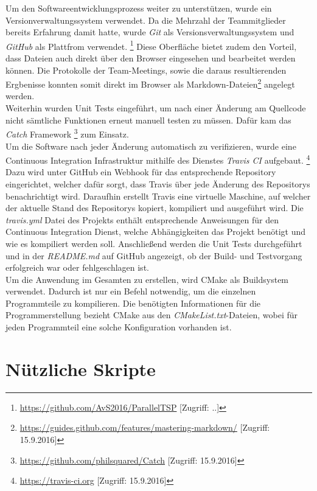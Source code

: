 \documentclass[12pt,a4paper]{scrreprt}
\newcommand{\absatz}{\\[12pt]}
\newcommand{\heute}{\the\day.\the\month.\the\year}
\begin{document}
Um den Softwareentwicklungsprozess weiter zu unterstützen, wurde ein Versionverwaltungssystem verwendet. Da die Mehrzahl der Teammitglieder bereits Erfahrung damit hatte, wurde \textit{Git} als Versionsverwaltungssystem und \textit{GitHub} als Plattfrom verwendet. \footnote{\url{https://github.com/AvS2016/ParallelTSP} [Zugriff: \heute]} Diese Oberfläche bietet zudem den Vorteil, dass Dateien auch direkt über den Browser eingesehen und bearbeitet werden können. Die Protokolle der Team-Meetings, sowie die daraus resultierenden Ergbenisse konnten somit direkt im Browser als Markdown-Dateien\footnote{\url{https://guides.github.com/features/mastering-markdown/} [Zugriff: 15.9.2016]} angelegt werden.\absatz
Weiterhin wurden Unit Tests eingeführt, um nach einer Änderung am Quellcode nicht sämtliche Funktionen erneut manuell testen zu müssen. Dafür kam das \textit{Catch} Framework
\footnote{\url{https://github.com/philsquared/Catch} [Zugriff: 15.9.2016]} zum Einsatz.\absatz
Um die Software nach jeder Änderung automatisch zu verifizieren, wurde eine Continuous Integration Infrastruktur mithilfe des Dienstes \textit{Travis CI} aufgebaut. \footnote{\url{https://travis-ci.org} [Zugriff: 15.9.2016]} Dazu wird unter GitHub ein Webhook für das entsprechende Repository eingerichtet, welcher dafür sorgt, dass Travis über jede Änderung des Repositorys benachrichtigt wird. Daraufhin erstellt Travis eine virtuelle Maschine, auf welcher der aktuelle Stand des Repositorys kopiert, kompiliert und ausgeführt wird. Die \textit{travis.yml} Datei des Projekts enthält entsprechende Anweisungen für den Continuous Integration Dienst, welche Abhängigkeiten das Projekt benötigt und wie es kompiliert werden soll. Anschließend werden die Unit Tests durchgeführt und in der \textit{README.md} auf GitHub angezeigt, ob der Build- und Testvorgang erfolgreich war oder fehlgeschlagen ist.\absatz
Um die Anwendung im Gesamten zu erstellen, wird CMake als Buildsystem verwendet. Dadurch ist nur ein Befehl notwendig, um die einzelnen Programmteile zu kompilieren. Die benötigten Informationen für die Programmerstellung bezieht CMake aus den \textit{CMakeList.txt}-Dateien, wobei für jeden Programmteil eine solche Konfiguration vorhanden ist.

\section{Nützliche Skripte}
\label{sec:nuetzliche_skripte}
\end{document}
